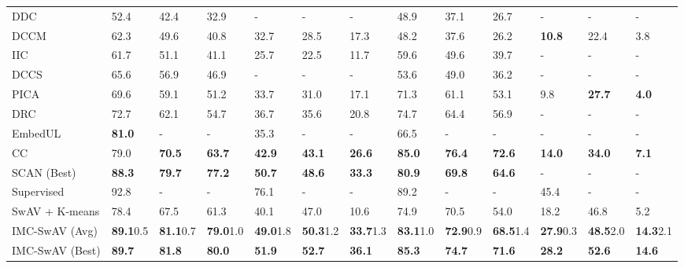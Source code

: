 \documentclass[journal]{IEEEtran}
\begin{document}
\begin{table*}[t]
\begin{center}
\begin{tabularx}{\textwidth}{l| Y Y Y|Y Y Y|Y Y Y|Y Y Y}
DDC \cite{2019arXiv190501681C} & 52.4 & 42.4 & 32.9 & - & - & - & 48.9 & 37.1 & 26.7 & - & - & -\\

DCCM \cite{DCCM} & 62.3 & 49.6 & 40.8 & 32.7 & 28.5 & 17.3 & 48.2 & 37.6 & 26.2 & \textbf{10.8} & 22.4 & 3.8\\

IIC \cite{Ji_2019_ICCV} & 61.7 & 51.1 & 41.1 & 25.7 & 22.5 & 11.7 & 59.6 & 49.6 & 39.7 & - & - & -\\

DCCS \cite{zhao2020deep} & 65.6 & 56.9 & 46.9 & - & - & - & 53.6 & 49.0 & 36.2 & - & - & -\\

PICA \cite{huang2020pica} & 69.6 & 59.1 & 51.2 & 33.7 & 31.0 & 17.1 & 71.3 & 61.1 & 53.1 & 9.8 & \textbf{27.7} & \textbf{4.0} \\

DRC \cite{zhong2020deep}  & 72.7 & 62.1 & 54.7 & 36.7 & 35.6 & 20.8 & 74.7 & 64.4 & 56.9 & - & - & -\\

EmbedUL \cite{DBLP:conf/eccv/HanPPKC20} & \textbf{81.0} & - & - & 35.3 & - & - & 66.5 & - & - & - & - & -\\

CC \cite{li2020contrastive} & 79.0 & \textbf{70.5} & \textbf{63.7} & \textbf{42.9} & \textbf{43.1} & \textbf{26.6} & \textbf{85.0} & \textbf{76.4} & \textbf{72.6} & \textbf{14.0} & \textbf{34.0} & \textbf{7.1}\\

SCAN \cite{vangansbeke2020scan} (Best) & \textbf{88.3} & \textbf{79.7} & \textbf{77.2} & \textbf{50.7 }& \textbf{48.6} & \textbf{33.3} & \textbf{80.9} & \textbf{69.8}  & \textbf{64.6} & - & - & -\\

\hline 

Supervised & 92.8 & - & - & 76.1  & - & - & 89.2 & - & - & 45.4 & - & -\\
SwAV\cite{caron2020unsupervised} + K-means & 78.4 & 67.5 & 61.3 & 40.1 & 47.0 & 10.6 & 74.9 & 70.5  & 54.0 & 18.2 & 46.8 & 5.2 \\

IMC-SwAV  (Avg) & \textbf{89.1}0.5 & \textbf{81.1}0.7 & \textbf{79.0}1.0 & \textbf{49.0}1.8 & \textbf{50.3}1.2 & \textbf{33.7}1.3 & \textbf{83.1}1.0 & \textbf{72.9}0.9 & \textbf{68.5}1.4 & \textbf{27.9}0.3 & \textbf{48.5}2.0 & \textbf{14.3}2.1 \\

IMC-SwAV  (Best) & \textbf{89.7} & \textbf{81.8} & \textbf{80.0} & \textbf{51.9} & \textbf{52.7} & \textbf{36.1} & \textbf{85.3} & \textbf{74.7}  & \textbf{71.6} & \textbf{28.2} & \textbf{52.6} & \textbf{14.6} \\

\hline
\end{tabularx}
\label{tab:Unsupervised Clustering}
\end{center}
\end{table*}
\end{document}
